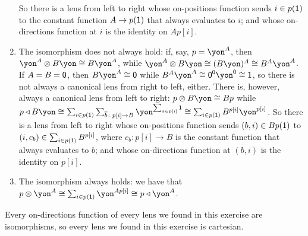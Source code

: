 \documentclass[Book-Poly]{subfiles}
\begin{document}
\begin{exercise}
\begin{solution}
\begin{enumerate}
	So there is a lens from left to right whose on-positions function sends $i\in p(\textsf{1})$ to the constant function $A\to p(\textsf{1})$ that always evaluates to $i$; and whose on-directions function at $i$ is the identity on $Ap[i]$.
	\item The isomorphism does not always hold: if, say, $p = \yon^A$, then $\yon^A \otimes B\yon \iso B\yon^A$, while $\yon^A \otimes B\yon \iso (B\yon)^A \iso B^A\yon^A$.
	If $A=B=\textsf{0}$, then $B\yon^A\iso\0$ while $B^A\yon^A\iso\0^\0\yon^\0\iso\1$, so there is not always a canonical lens from right to left, either.
	There is, however, always a canonical lens from left to right: $p\otimes B\yon\iso Bp$ while $p\tri B\yon\iso\sum_{i\in p(\1)}\sum_{\ol{b}\colon p[i]\to B}\yon^{\sum_{a\in p[i]}\1}\iso\sum_{i\in p(\1)}B^{p[i]}\yon^{p[i]}$.
	So there is a lens from left to right whose on-positions function sends $(b,i)\in Bp(\textsf{1})$ to $(i,c_b)\in\sum_{i\in p(\textsf{1})}B^{p[i]}$, where $c_b\colon p[i]\to B$ is the constant function that always evaluates to $b$; and whose on-directions function at $(b,i)$ is the identity on $p[i]$.
	\item The isomorphism always holds: we have that $p \otimes \yon^A \iso \sum_{i \in p(\1)} \yon^{Ap[i]} \iso p \tri \yon^A$.
\end{enumerate}
Every on-directions function of every lens we found in this exercise are isomorphisms, so every lens we found in this exercise is cartesian.
\end{solution}
\end{exercise}
\end{document}
